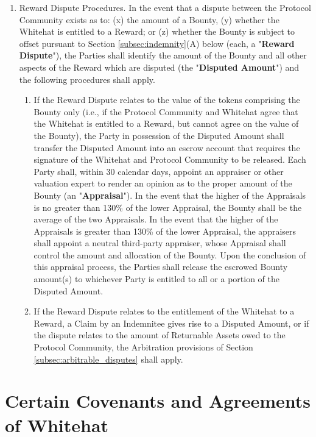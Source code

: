 \documentclass{article}
\begin{document}
\begin{enumerate}[label=\Alph*.]
    \item Reward Dispute Procedures. In the event that a dispute between the Protocol Community exists as to: (x) the amount of a Bounty, (y) whether the Whitehat is entitled to a Reward; or (z) whether the Bounty is subject to offset pursuant to Section \ref{subsec:indemnity}(A) below (each, a "\textbf{Reward Dispute}"), the Parties shall identify the amount of the Bounty and all other aspects of the Reward which are disputed (the "\textbf{Disputed Amount}") and the following procedures shall apply.

          \begin{enumerate}
              \item If the Reward Dispute relates to the value of the tokens comprising the Bounty only (i.e., if the Protocol Community and Whitehat agree that the Whitehat is entitled to a Reward, but cannot agree on the value of the Bounty), the Party in possession of the Disputed Amount shall transfer the Disputed Amount into an escrow account that requires the signature of the Whitehat and Protocol Community to be released. Each Party shall, within 30 calendar days, appoint an appraiser or other valuation expert to render an opinion as to the proper amount of the Bounty (an "\textbf{Appraisal}"). In the event that the higher of the Appraisals is no greater than 130\% of the lower Appraisal, the Bounty shall be the average of the two Appraisals. In the event that the higher of the Appraisals is greater than 130\% of the lower Appraisal, the appraisers shall appoint a neutral third-party appraiser, whose Appraisal shall control the amount and allocation of the Bounty. Upon the conclusion of this appraisal process, the Parties shall release the escrowed Bounty amount(s) to whichever Party is entitled to all or a portion of the Disputed Amount.

              \item If the Reward Dispute relates to the entitlement of the Whitehat to a Reward, a Claim by an Indemnitee gives rise to a Disputed Amount, or if the dispute relates to the amount of Returnable Assets owed to the Protocol Community, the Arbitration provisions of Section \ref{subsec:arbitrable_disputes} shall apply.

          \end{enumerate}
\end{enumerate}

\section{Certain Covenants and Agreements of Whitehat}\label{sec:convenants}
\end{document}
